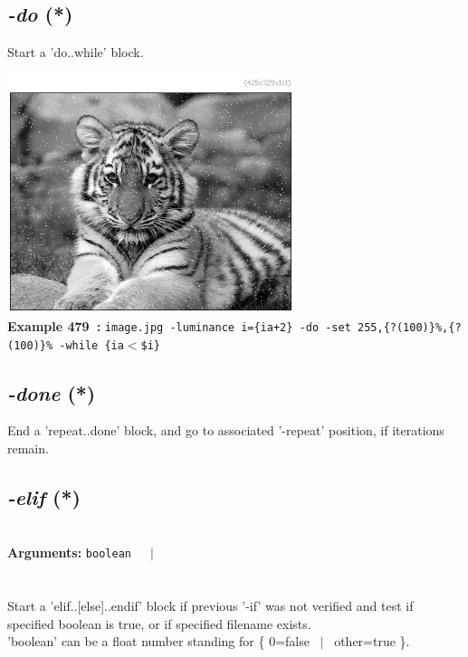 \documentclass[a4paper,11pt,twoside]{book}
\begin{document}
\subsection{\emph{-do} (*)}\vspace*{-0.5em}
Start a 'do..while' block.
\begin{center}\includegraphics[keepaspectratio=true,height=7cm,width=\textwidth]{img/gmic_def479.jpg}\\
{\footnotesize \textbf{Example 479~:} \texttt{image.jpg -luminance i=\{ia+2\} -do -set 255,\{?(100)\}\%,\{?(100)\}\% -while \{ia$<$\$i\}}}
\end{center}

\subsection{\emph{-done} (*)}\vspace*{-0.5em}
End a 'repeat..done' block, and go to associated '-repeat' position, if iterations remain.


\subsection{\emph{-elif} (*)}\vspace*{-0.5em}
~\\\textbf{Arguments: } 
{\small \texttt{boolean}}~~~$|$\\
\\~\\
Start a 'elif..[else]..endif' block if previous '-if' was not verified
and test if specified boolean is true, or if specified filename exists.
~\\'boolean' can be a float number standing for \{ 0=false ~$|$~ other=true \}.
\end{document}
